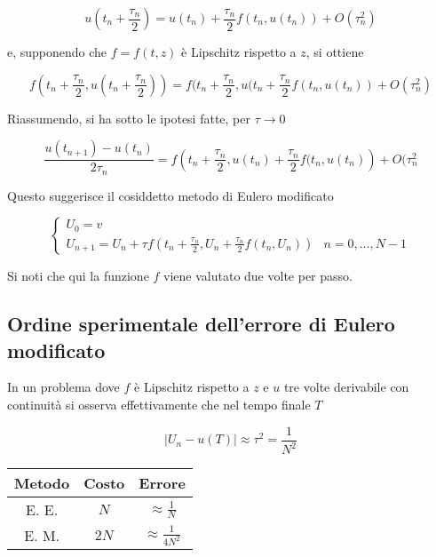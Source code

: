 \documentclass[hidelinks, 10pt]{report}
\begin{document}
\[ u \left( t_{n} + \frac{\tau_{n}}{2} \right) = u(t_{n}) + \frac{\tau_{n}}{2} f(t_{n}, u(t_{n})) + O(\tau_{n}^{2}) \]

e, supponendo che $ f = f(t, z) $ \`e Lipschitz rispetto a $ z $, si ottiene

\[ f \left( t_{n} + \frac{\tau_{n}}{2}, u \left(t_{n} + \frac{\tau_{n}}{2} \right) \right) = f(t_{n} + \frac{\tau_{n}}{2}, u(t_{n} + \frac{\tau_{n}}{2} f(t_{n}, u(t_{n}) ) + O(\tau_{n}^{2})  \]

Riassumendo, si ha sotto le ipotesi fatte, per $ \tau \to 0 $

\[ \frac{u(t_{n + 1}) - u(t_{n})}{2 \tau_{n}} = f \left( t_{n} + \frac{\tau_{n}}{2}, u(t_{n}) + \frac{\tau_{n}}{2} f(t_{n}, u(t_{n}) \right) + O(\tau_{n}^{2} \]

Questo suggerisce il cosiddetto metodo di Eulero modificato

\[
\begin{cases}
U_{0} = v \\
U_{n + 1} = U_{n} + \tau f \left( t_{n} + \frac{\tau_{n}}{2}, U_{n} + \frac{\tau_{n}}{2} f(t_{n}, U_{n}) \right)	 & n = 0, \dotsc, N - 1
\end{cases}
\]

Si noti che qui la funzione $ f $ viene valutato due volte per passo. 

\subsection{Ordine sperimentale dell'errore di Eulero modificato}
In un problema dove $ f $ \`e Lipschitz rispetto a  $ z $ e $ u $ tre volte derivabile con continuit\`a si osserva effettivamente che nel tempo finale $ T $

\[ \vert U_{n} - u(T) \vert \approx \tau^{2} = \frac{1}{N^{2}} \]

\begin{center}
\begin{tabular}{c|c|c}
	Metodo & Costo & Errore \\
\hline
	E. E. & $ N $ & $ \approx \frac{1}{N} $ \\
\hline
	E. M. & $ 2N $ & $ \approx \frac{1}{4N^{2}} $ \\
\end{tabular}
\end{center}

%
%
\end{document}
